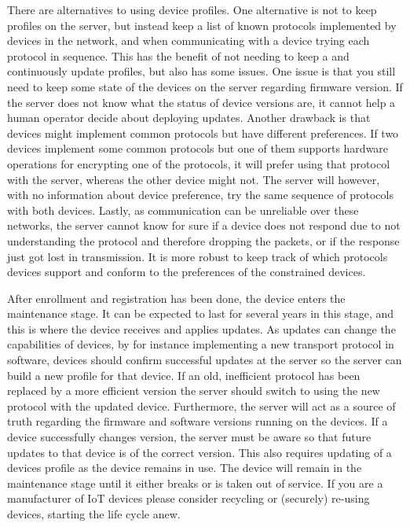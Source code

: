 \documentclass[0-thesis.tex]{subfiles}
\begin{document}
There are alternatives to using device profiles. One alternative is not to keep profiles
on the server, but instead keep a list of known protocols implemented by devices in the
network, and when communicating with a device trying each protocol in sequence. This has
the benefit of not needing to keep a and continuously update profiles, but also has some
issues. One issue is that you still need to keep some state of the devices on the server
regarding firmware version. If the server does not know what the status of device versions
are, it cannot help a human operator decide about deploying updates. Another drawback is
that devices might implement common protocols but have different preferences. If two
devices implement some common protocols but one of them supports hardware operations for
encrypting one of the protocols, it will prefer using that protocol with the server,
whereas the other device might not. The server will however, with no information about
device preference, try the same sequence of protocols with both devices. Lastly, as
communication can be unreliable over these networks, the server cannot know for sure if a
device does not respond due to not understanding the protocol and therefore dropping the
packets, or if the response just got lost in transmission. It is more robust to keep track
of which protocols devices support and conform to the preferences of the constrained
devices.

After enrollment and registration has been done, the device enters the maintenance stage.
It can be expected to last for several years in this stage, and this is where the device
receives and applies updates. As updates can change the capabilities of devices, by for
instance implementing a new transport protocol in software, devices should confirm
successful updates at the server so the server can build a new profile for that device. If
an old, inefficient protocol has been replaced by a more efficient version the server
should switch to using the new protocol with the updated device. Furthermore, the server
will act as a source of truth regarding the firmware and software versions running on the
devices. If a device successfully changes version, the server must be aware so that future
updates to that device is of the correct version. This also requires updating of a devices
profile as the device remains in use. The device will remain in the maintenance stage
until it either breaks or is taken out of service. If you are a manufacturer of IoT
devices please consider recycling or (securely) re-using devices, starting the life cycle
anew.
\end{document}
